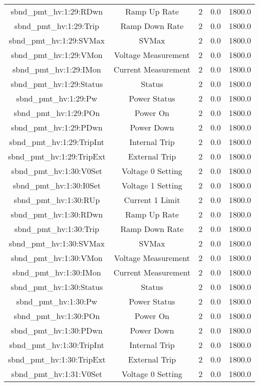 \begin{table}[ptb]
\begin{tabular}{c | c c c c}
sbnd_pmt_hv:1:29:RDwn & Ramp Up Rate & 2 & 0.0 & 1800.0\\ 
sbnd_pmt_hv:1:29:Trip & Ramp Down Rate & 2 & 0.0 & 1800.0\\ 
sbnd_pmt_hv:1:29:SVMax & SVMax & 2 & 0.0 & 1800.0\\ 
sbnd_pmt_hv:1:29:VMon & Voltage Measurement & 2 & 0.0 & 1800.0\\ 
sbnd_pmt_hv:1:29:IMon & Current Measurement & 2 & 0.0 & 1800.0\\ 
sbnd_pmt_hv:1:29:Status & Status & 2 & 0.0 & 1800.0\\ 
sbnd_pmt_hv:1:29:Pw & Power Status & 2 & 0.0 & 1800.0\\ 
sbnd_pmt_hv:1:29:POn & Power On & 2 & 0.0 & 1800.0\\ 
sbnd_pmt_hv:1:29:PDwn & Power Down & 2 & 0.0 & 1800.0\\ 
sbnd_pmt_hv:1:29:TripInt & Internal Trip & 2 & 0.0 & 1800.0\\ 
sbnd_pmt_hv:1:29:TripExt & External Trip & 2 & 0.0 & 1800.0\\ 
sbnd_pmt_hv:1:30:V0Set & Voltage 0 Setting & 2 & 0.0 & 1800.0\\ 
sbnd_pmt_hv:1:30:I0Set & Voltage 1 Setting & 2 & 0.0 & 1800.0\\ 
sbnd_pmt_hv:1:30:RUp & Current 1 Limit & 2 & 0.0 & 1800.0\\ 
sbnd_pmt_hv:1:30:RDwn & Ramp Up Rate & 2 & 0.0 & 1800.0\\ 
sbnd_pmt_hv:1:30:Trip & Ramp Down Rate & 2 & 0.0 & 1800.0\\ 
sbnd_pmt_hv:1:30:SVMax & SVMax & 2 & 0.0 & 1800.0\\ 
sbnd_pmt_hv:1:30:VMon & Voltage Measurement & 2 & 0.0 & 1800.0\\ 
sbnd_pmt_hv:1:30:IMon & Current Measurement & 2 & 0.0 & 1800.0\\ 
sbnd_pmt_hv:1:30:Status & Status & 2 & 0.0 & 1800.0\\ 
sbnd_pmt_hv:1:30:Pw & Power Status & 2 & 0.0 & 1800.0\\ 
sbnd_pmt_hv:1:30:POn & Power On & 2 & 0.0 & 1800.0\\ 
sbnd_pmt_hv:1:30:PDwn & Power Down & 2 & 0.0 & 1800.0\\ 
sbnd_pmt_hv:1:30:TripInt & Internal Trip & 2 & 0.0 & 1800.0\\ 
sbnd_pmt_hv:1:30:TripExt & External Trip & 2 & 0.0 & 1800.0\\ 
sbnd_pmt_hv:1:31:V0Set & Voltage 0 Setting & 2 & 0.0 & 1800.0\\ 

\end{tabular}
\end{table}
